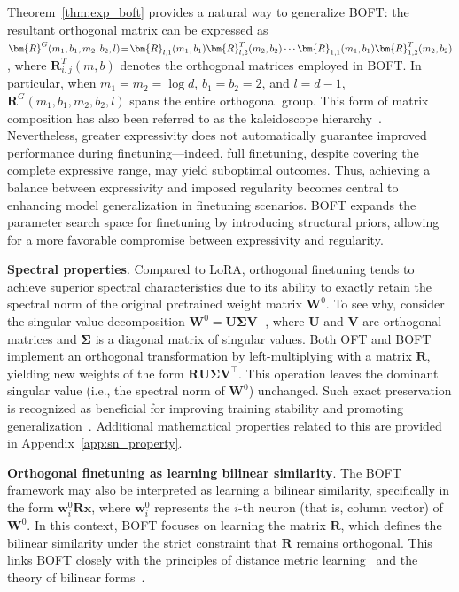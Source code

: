 Theorem~\ref{thm:exp_boft} provides a natural way to generalize BOFT: the resultant orthogonal matrix can be expressed as $\thickmuskip=2mu \medmuskip=2mu \bm{R}^G(m_1,b_1,m_2,b_2,l)=\bm{R}_{l,1}(m_1,b_1)\bm{R}_{l,2}^T(m_2,b_2)\cdots\bm{R}_{1,1}(m_1,b_1)\bm{R}_{1,2}^T(m_2,b_2)$, where $\bm{R}_{i,j}^T(m,b)$ denotes the orthogonal matrices employed in BOFT. In particular, when $m_1=m_2=\log d$, $b_1=b_2=2$, and $l=d-1$, $\bm{R}^G(m_1,b_1,m_2,b_2,l)$ spans the entire orthogonal group. This form of matrix composition has also been referred to as the kaleidoscope hierarchy~\cite{dao2019kaleidoscope}. Nevertheless, greater expressivity does not automatically guarantee improved performance during finetuning—indeed, full finetuning, despite covering the complete expressive range, may yield suboptimal outcomes. Thus, achieving a balance between expressivity and imposed regularity becomes central to enhancing model generalization in finetuning scenarios. BOFT expands the parameter search space for finetuning by introducing structural priors, allowing for a more favorable compromise between expressivity and regularity.

\textbf{Spectral properties}. Compared to LoRA, orthogonal finetuning tends to achieve superior spectral characteristics due to its ability to exactly retain the spectral norm of the original pretrained weight matrix $\bm{W}^0$. To see why, consider the singular value decomposition $\bm{W}^0=\bm{U}\bm{\Sigma}\bm{V}^\top$, where $\bm{U}$ and $\bm{V}$ are orthogonal matrices and $\bm{\Sigma}$ is a diagonal matrix of singular values. Both OFT and BOFT implement an orthogonal transformation by left-multiplying with a matrix $\bm{R}$, yielding new weights of the form $\bm{R}\bm{U}\bm{\Sigma}\bm{V}^\top$. This operation leaves the dominant singular value (i.e., the spectral norm of $\bm{W}^0$) unchanged. Such exact preservation is recognized as beneficial for improving training stability and promoting generalization~\cite{miyato2018spectral,yoshida2017spectral}. Additional mathematical properties related to this are provided in Appendix~\ref{app:sn_property}.

\textbf{Orthogonal finetuning as learning bilinear similarity}. The BOFT framework may also be interpreted as learning a bilinear similarity, specifically in the form $\bm{w}^0_i\bm{R}\bm{x}$, where $\bm{w}^0_i$ represents the $i$-th neuron (that is, column vector) of $\bm{W}^0$. In this context, BOFT focuses on learning the matrix $\bm{R}$, which defines the bilinear similarity under the strict constraint that $\bm{R}$ remains orthogonal. This links BOFT closely with the principles of distance metric learning~\cite{xing2002distance} and the theory of bilinear forms~\cite{roman2005advanced}.

